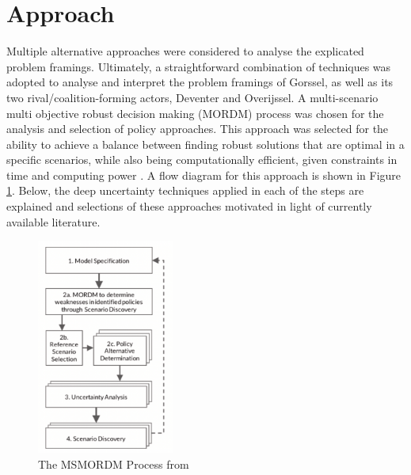 \section{Approach}
\label{s:approach}


Multiple alternative approaches were considered to analyse the explicated problem framings. Ultimately, a straightforward combination of techniques was adopted to analyse and interpret the problem framings of Gorssel, as well as its two rival/coalition-forming actors, Deventer and Overijssel. A multi-scenario multi objective robust decision making (MORDM) process was chosen for the analysis and selection of policy approaches. This approach was selected for the ability to achieve a balance between finding robust solutions that are optimal in a specific scenarios, while also being computationally efficient, given constraints in time and computing power \parencite{bartholomew_considering_2020}. A flow diagram for this approach is shown in Figure \ref{fig:msmordm}. Below, the deep uncertainty techniques applied in each of the steps are explained and selections of these approaches motivated in light of currently available literature. 

\begin{figure}[h]
    \centering
    \includegraphics[width=0.4\textwidth]{report/figures/msmordm.png}
    \caption{The MSMORDM Process from \citeauthor{bartholomew_considering_2020}}
    \label{fig:msmordm}
\end{figure}

